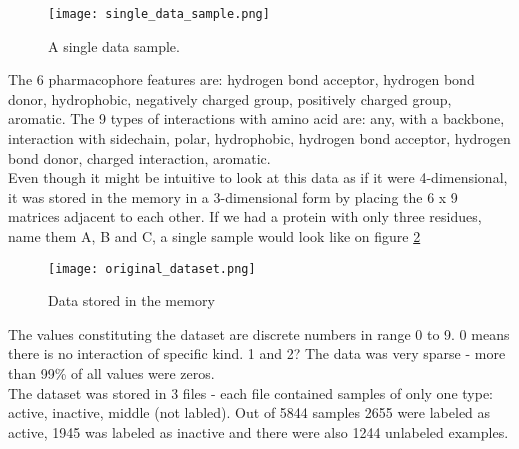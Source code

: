 \documentclass[a4paper,10pt]{report}
\begin{document}
	\begin{figure}[h!]
	  \centering
	  \texttt{[image: single\_data\_sample.png]}
	  \caption{A single data sample.}
	  \label{fig:single_data_sample2}
	\end{figure} 
	
	The 6 pharmacophore features are: hydrogen bond acceptor, hydrogen bond donor, hydrophobic, negatively charged group, positively charged group, aromatic. The 9 types of interactions with amino acid are: any, with a backbone, interaction with sidechain, polar, hydrophobic, hydrogen bond acceptor, hydrogen bond donor, charged interaction, aromatic.\\
	
	Even though it might be intuitive to look at this data as if it were 4-dimensional, it was stored in the memory in a 3-dimensional form by placing the 6 x 9 matrices adjacent to each other. If we had a protein with only three residues, name them A, B and C, a single sample would look like on figure \ref{fig:data_original}\\
	
	\begin{figure}[h!]
	  \centering
	  \texttt{[image: original\_dataset.png]}
	  \caption{Data stored in the memory}
	  \label{fig:data_original}
	\end{figure} 
	
	The values constituting the dataset are discrete numbers in range 0 to 9. 0 means there is no interaction of specific kind. 1 and 2? The data was very sparse - more than 99\% of all values were zeros.\\
	
	The dataset was stored in 3 files - each file contained samples of only one type: active, inactive, middle (not labled). Out of 5844 samples 2655 were labeled as active, 1945 was labeled as inactive and there were also 1244 unlabeled examples.\\
	

	

	    
\end{document}
